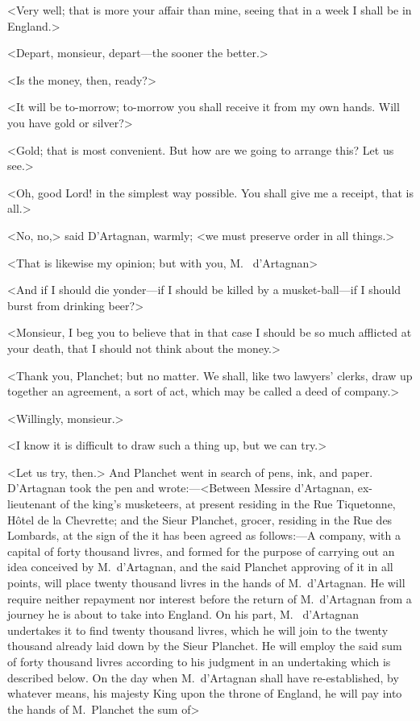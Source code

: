 <Very well; that is more your affair than mine, seeing that in a week I shall be in England.>

<Depart, monsieur, depart—the sooner the better.>

<Is the money, then, ready?>

<It will be to-morrow; to-morrow you shall receive it from my own hands. Will you have gold or silver?>

<Gold; that is most convenient. But how are we going to arrange this? Let us see.>

<Oh, good Lord! in the simplest way possible. You shall give me a receipt, that is all.>

<No, no,> said D'Artagnan, warmly; <we must preserve order in all things.>

<That is likewise my opinion; but with you, M.~ d'Artagnan\longdash>

<And if I should die yonder—if I should be killed by a musket-ball—if I should burst from drinking beer?>

<Monsieur, I beg you to believe that in that case I should be so much afflicted at your death, that I should not think about the money.>

<Thank you, Planchet; but no matter. We shall, like two lawyers' clerks, draw up together an agreement, a sort of act, which may be called a deed of company.>

<Willingly, monsieur.>

<I know it is difficult to draw such a thing up, but we can try.>

<Let us try, then.> And Planchet went in search of pens, ink, and paper. D'Artagnan took the pen and wrote:—<Between Messire d'Artagnan, ex-lieutenant of the king's musketeers, at present residing in the Rue Tiquetonne, Hôtel de la Chevrette; and the Sieur Planchet, grocer, residing in the Rue des Lombards, at the sign of the  it has been agreed as follows:—A company, with a capital of forty thousand livres, and formed for the purpose of carrying out an idea conceived by M.~d'Artagnan, and the said Planchet approving of it in all points, will place twenty thousand livres in the hands of M.~d'Artagnan. He will require neither repayment nor interest before the return of M.~d'Artagnan from a journey he is about to take into England. On his part, M.~ d'Artagnan undertakes it to find twenty thousand livres, which he will join to the twenty thousand already laid down by the Sieur Planchet. He will employ the said sum of forty thousand livres according to his judgment in an undertaking which is described below. On the day when M.~d'Artagnan shall have re-established, by whatever means, his majesty King  upon the throne of England, he will pay into the hands of M.~Planchet the sum of\longdash>

